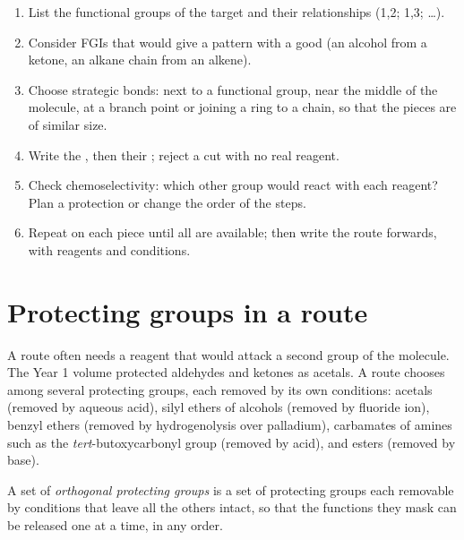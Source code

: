 \begin{method}\label{met:b2:retrosynthesis:retrosynthesis}
\begin{enumerate}
  \item List the functional groups of the target and their relationships (1,2; 1,3; \dots).
  \item Consider FGIs that would give a pattern with a good  (an alcohol from a ketone, an
        alkane chain from an alkene).
  \item Choose strategic bonds: next to a functional group, near the middle of the molecule, at a
        branch point or joining a ring to a chain, so that the pieces are of similar size.
  \item Write the , then their ; reject a cut with no real reagent.
  \item Check chemoselectivity: which other group would react with each reagent? Plan a protection
        or change the order of the steps.
  \item Repeat on each piece until all are available; then write the route forwards, with reagents and
        conditions.
\end{enumerate}
\end{method}

\section{Protecting groups in a route}

A route often needs a reagent that would attack a second group of the molecule. The Year 1 volume
protected aldehydes and ketones as acetals. A route chooses among several protecting groups, each
removed by its own conditions: acetals (removed by aqueous acid), silyl ethers of alcohols (removed by
fluoride ion), benzyl ethers (removed by hydrogenolysis over palladium), carbamates of amines such as
the \textit{tert}-butoxycarbonyl group (removed by acid), and esters (removed by base).

\begin{definition}\label{def:b2:retrosynthesis:orthogonal}
A set of \emph{orthogonal protecting groups} is a set of protecting
groups each removable by conditions that leave all the others intact, so that the functions they mask
can be released one at a time, in any order.
\end{definition}


